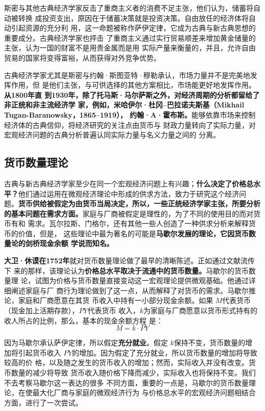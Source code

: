 斯密与其他古典经济学家反击了重商主义者的消费不足主张，他们认为，储蓄将自动被转换
成投资支出，原因在于储蓄决策就是投资决策。自由放任的经济体将自动引起资源的充分利
用，这一命题被称作萨伊定律，它成为古典与新古典思想的重要成分。古典经济学家也抨击
了重商主义通过实行贸易顺差来增加黄金储量的主张，认为一国的财富不是用贵金属而是用
实际产量来衡量的，并且，允许自由贸易的国家将变得富裕，从而获得对外竞争优势。

古典经济学家尤其是斯密与约翰·斯图亚特·穆勒承认，市场力量并不是完美地发挥作用，但
是他们主张，与可供选择的其他方案相比，市场能更好地发挥作用。\textbf{从1800年直
  到1930年，除了托马斯·马尔萨斯之外，对经济周期的分析都留给了非正统和非主流经济学
  家，例如，米哈伊尔·杜冈--巴拉诺夫斯基（Mikhail Tugan-Baranowsky，1865--1919），
  约翰·A·霍布斯。}能够依靠市场来控制经济体的古典信仰，将经济研究的关注点由货币与
财政力量转向了实际力量，对宏观经济问题的古典分析普遍认同实际力量与名义力量之间的
分离。
\clearpage

\subsection{货币数量理论}

古典与新古典经济学家至少在同一个宏观经济问题上有兴趣；\textbf{什么决定了价格总水
  平？}他们通过运用在微观经济理论中形成的供求方法，致力于研究这个经济问
题。\textbf{货币供给被假定为由货币当局决定，所以，一些正统经济学家主张，所要分析
  的基本问题在需求方面。}家庭与厂商被假定是理性的，为了不同的使用目的而对货币有和
需求。瓦尔拉斯、门格尔，还有其他一些人创造了一种供求分析来解释货币的价值，但是，
这些理论中最为著名的可能是\textbf{马歇尔发展的理论，它因货币数量论的剑桥现金余额
  学说而知名。}

\textbf{大卫·休谟在1752年}就对货币数量理论做了最早的清晰陈述。正如通过文献流传下
来的那样，该理论认为\textbf{价格总水平取决于流通中的货币数量。}马歇尔的货币数量理
论，试图为价格与货币数量直接变动这一宏观理论提供微观基础。他通过详细阐述家庭与厂
商行为理论做到了这一点，从而解释了对货币的需求。马歇尔推论，家庭和厂商愿意在其货
币收入中持有一小部分现金余额。如果 $M$代表货币（现金加上活期存款），$PY$代表货币
收入，$k$为家庭与厂商愿意以货币形式持有的收人所占的比例，那么，基本的现金余额方程
是：
\[ M = k \cdot PY\]

因为马歇尔承认萨伊定律，所以假定\textbf{充分就业}。假定 $k$保持不变，货币数量的增
加将引起货币收入 $PY$的增加。因为假定了充分就业，所以货币数量的增加将导致较高的价
格，以及随之发生的货币收入的增加；然而，实际收入并没有改变。货币数量的减少将导致
货币收入随价格下降而减少，实际收入也将保持不变。我们不去考察马歇尔这一表达的很多
不同方面，重要的一点是，马歇尔的货币数量理论，在使最大化厂商与家庭的微观经济行为
与价格总水平的宏观经济问题相结合方面，进行了一次尝试。

